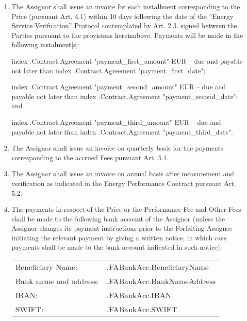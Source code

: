 \documentclass[a4paper]{article}
\begin{document}
\begin{enumerate}
\item{The Assignor shall issue an invoice for each installment
    corresponding to the Price (pursuant Art. 4.1) within 10 days
    following the date of the “Energy Service Verification” Protocol contemplated
    by Art. 2.3. signed between the Parties pursuant to the provisions
    hereinabove. Payments will be made in the following
    instalment{[}s{]}: \par

    {{index .Contract.Agreement "payment_first_amount"}} EUR – due and payable not later than {{index .Contract.Agreement "payment_first_date"}}; \par
    {{index .Contract.Agreement "payment_second_amount"}} EUR – due and payable not later than {{index .Contract.Agreement "payment_second_date"}}; and \par
    {{index .Contract.Agreement "payment_third_amount"}} EUR – due and payable not later than {{index .Contract.Agreement "payment_third_date"}}.\par}

\item{The Assignor shall issue an invoice on quarterly basis for the
    payments corresponding to the accrued Fees pursuant Art. 5.1.}

\item{The Assignor shall issue an invoice on annual basis after
    measurement and verification as indicated in the Energy
    Performance Contract pursuant Art. 5.2.}

\item{The payments in respect of the Price or the Performance Fee and
    Other Fees shall be made to the following bank account of the
    Assignor (unless the Assignor changes its payment instructions
    prior to the Forfaiting Assignee initiating the relevant payment
    by giving a written notice, in which case payments shall be made
    to the bank account indicated in such notice): \par

    \begin{tabu}{XX[2]}
      Beneficiary Name: 	& 	{{.FABankAcc.BeneficiaryName}} 	\\
      Bank name and address: 	& 	{{.FABankAcc.BankNameAddress}} 	\\
      IBAN:			& 	{{.FABankAcc.IBAN}} 		\\
      SWIFT:			& 	{{.FABankAcc.SWIFT}} 		\\
    \end{tabu}}


\end{enumerate}
\end{document}
